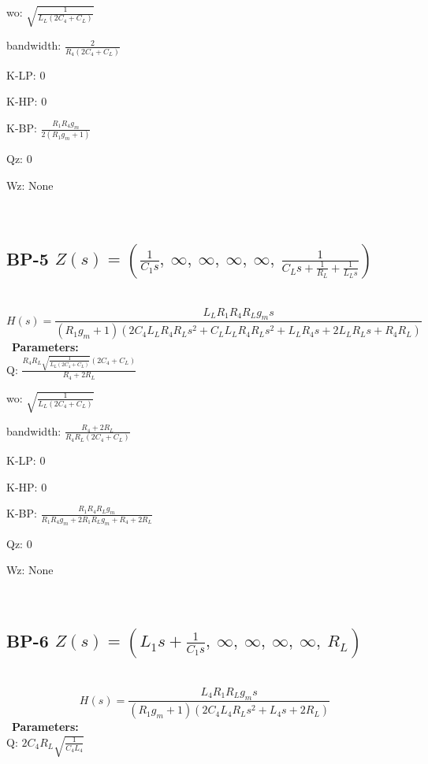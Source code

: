 \documentclass{article}
\begin{document}
wo: $\sqrt{\frac{1}{L_{L} \left(2 C_{4} + C_{L}\right)}}$\ 

bandwidth: $\frac{2}{R_{4} \left(2 C_{4} + C_{L}\right)}$\ 

K-LP: $0$\ 

K-HP: $0$\ 

K-BP: $\frac{R_{1} R_{4} g_{m}}{2 \left(R_{1} g_{m} + 1\right)}$\ 

Qz: $0$\ 

Wz: $\text{None}$\ 

\ 

\subsection{BP-5 $Z(s) = \left( \frac{1}{C_{1} s}, \  \infty, \  \infty, \  \infty, \  \infty, \  \frac{1}{C_{L} s + \frac{1}{R_{L}} + \frac{1}{L_{L} s}}\right)$ } \ 
\textbf{\[H(s) = \frac{L_{L} R_{1} R_{4} R_{L} g_{m} s}{\left(R_{1} g_{m} + 1\right) \left(2 C_{4} L_{L} R_{4} R_{L} s^{2} + C_{L} L_{L} R_{4} R_{L} s^{2} + L_{L} R_{4} s + 2 L_{L} R_{L} s + R_{4} R_{L}\right)}\] } \ 
\textbf{Parameters:}\\ 

Q: $\frac{R_{4} R_{L} \sqrt{\frac{1}{L_{L} \left(2 C_{4} + C_{L}\right)}} \left(2 C_{4} + C_{L}\right)}{R_{4} + 2 R_{L}}$\ 

wo: $\sqrt{\frac{1}{L_{L} \left(2 C_{4} + C_{L}\right)}}$\ 

bandwidth: $\frac{R_{4} + 2 R_{L}}{R_{4} R_{L} \left(2 C_{4} + C_{L}\right)}$\ 

K-LP: $0$\ 

K-HP: $0$\ 

K-BP: $\frac{R_{1} R_{4} R_{L} g_{m}}{R_{1} R_{4} g_{m} + 2 R_{1} R_{L} g_{m} + R_{4} + 2 R_{L}}$\ 

Qz: $0$\ 

Wz: $\text{None}$\ 

\ 

\subsection{BP-6 $Z(s) = \left( L_{1} s + \frac{1}{C_{1} s}, \  \infty, \  \infty, \  \infty, \  \infty, \  R_{L}\right)$ } \ 
\textbf{\[H(s) = \frac{L_{4} R_{1} R_{L} g_{m} s}{\left(R_{1} g_{m} + 1\right) \left(2 C_{4} L_{4} R_{L} s^{2} + L_{4} s + 2 R_{L}\right)}\] } \ 
\textbf{Parameters:}\\ 

Q: $2 C_{4} R_{L} \sqrt{\frac{1}{C_{4} L_{4}}}$\ 
\end{document}

